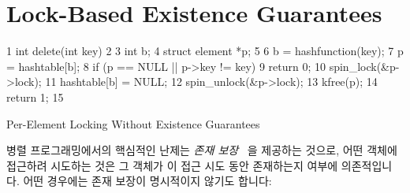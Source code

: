 
\section{Lock-Based Existence Guarantees}
\label{sec:locking:Lock-Based Existence Guarantees}

\begin{listing}[tbp]
{ \scriptsize
\begin{verbbox}
  1 int delete(int key)
  2 {
  3   int b;
  4   struct element *p;
  5
  6   b = hashfunction(key);
  7   p = hashtable[b];
  8   if (p == NULL || p->key != key)
  9     return 0;
 10   spin_lock(&p->lock);
 11   hashtable[b] = NULL;
 12   spin_unlock(&p->lock);
 13   kfree(p);
 14   return 1;
 15 }
\end{verbbox}
}
\centering
\theverbbox
\caption{Per-Element Locking Without Existence Guarantees}
\label{lst:locking:Per-Element Locking Without Existence Guarantees}
\end{listing}

병렬 프로그래밍에서의 핵심적인 난제는 \emph{존재 보장}~\cite{Gamsa99} 을
제공하는 것으로, 어떤 객체에 접근하려 시도하는 것은 그 객체가 이 접근 시도 동안
존재하는지 여부에 의존적입니다.
어떤 경우에는 존재 보장이 명시적이지 않기도 합니다:
\iffalse

A key challenge in parallel programming is to provide
\emph{existence guarantees}~\cite{Gamsa99},
so that attempts to access a given object can rely on that object
being in existence throughout a given access attempt.
In some cases, existence guarantees are implicit:
\fi

